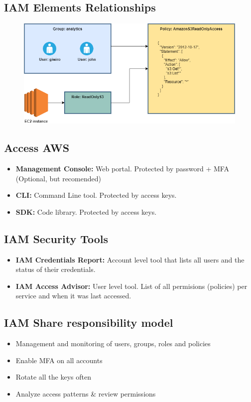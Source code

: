 \subsection{IAM Elements Relationships}
\begin{figure}[h]
\includegraphics[scale=0.5]{iam/iam}
\centering
\end{figure}

\subsection{Access AWS}
\begin{itemize}
	\item{\textbf{Management Console:}} Web portal. Protected by password + MFA (Optional, but recomended)
	\item{\textbf{CLI:}} Command Line tool. Protected by access keys.
	\item{\textbf{SDK:}} Code library. Protected by access keys.
\end{itemize}

\subsection{IAM Security Tools}
\begin{itemize}
	\item{\textbf{IAM Credentials Report:}} Account level tool that lists all users and the status of their credentials.
\item{\textbf{IAM Access Advisor:}} User level tool. List of all permisions (policies) per service and when it was last accessed.
\end{itemize}

\subsection{IAM Share responsibility model}
\begin{itemize}
	\item{Management and monitoring of users, groups, roles and policies}
	\item{Enable MFA on all accounts}
	\item{Rotate all the keys often}
	\item{Analyze access patterns \& review permissions}
\end{itemize}

